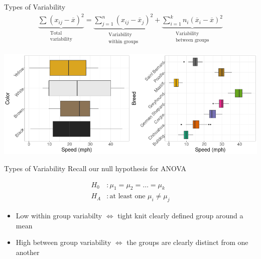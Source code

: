 \documentclass{beamer}
\begin{document}
\begin{frame}{Types of Variability}
\small
\begin{align*}
\underbrace{\sum_{} (x_{ij} - \overline{x})^2}_{\substack{\text{Total} \\ \text{variability}}} = \underbrace{\sum_{j=1}^n (x_{ij} - \overline{x}_j)^2}_{\substack{\text{Variability} \\ \text{within groups}}} + \underbrace{\sum_{i=1}^k n_i(\overline{x}_i - \overline{x})^2}_{\substack{\text{Variability} \\ \text{between groups}}} 
\end{align*}

\begin{center}
\includegraphics[scale=0.35]{img/dog_var_compare.png}
\end{center}

\end{frame}



\begin{frame}{Types of Variability}
Recall our null hypothesis for ANOVA

\begin{align*}
H_0&: \mu_1 = \mu_2 = \dots = \mu_k \\
H_A&: \text{at least one } \mu_i \not= \mu_j
\end{align*} \vspace{4mm}

\begin{itemize}
\item Low within group variabilty $\Leftrightarrow$ tight knit clearly defined group around a mean
\item High between group variability $\Leftrightarrow$ the groups are clearly distinct from one another
\end{itemize}
\end{frame}
\end{document}
